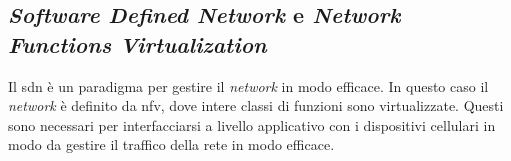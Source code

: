 \clearpage

\subsection{\textit{Software Defined Network} e  \textit{Network Functions Virtualization}}
Il \gls{sdn} è un paradigma per gestire il \textit{network} in modo efficace. 
In questo caso il \textit{network} è definito da \gls{nfv}, dove intere classi di funzioni sono virtualizzate.
Questi sono necessari per interfacciarsi a livello applicativo con i dispositivi cellulari 
in modo da gestire il traffico della rete in modo efficace\cite{5g-sdn}.